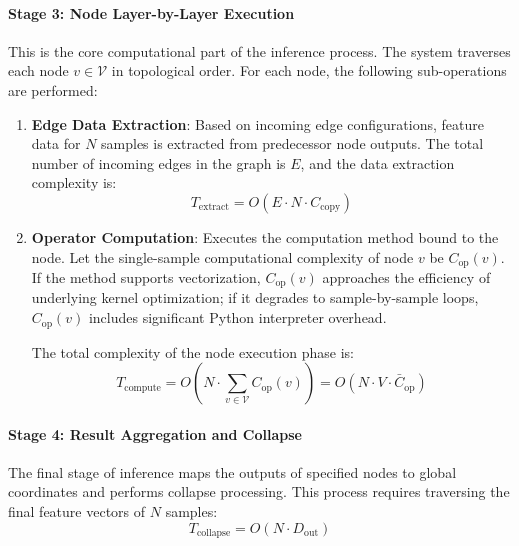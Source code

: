 \paragraph{Stage 3: Node Layer-by-Layer Execution}
This is the core computational part of the inference process. The system traverses each node $v \in \mathcal{V}$ in topological order. For each node, the following sub-operations are performed:

\begin{enumerate}
    \item \textbf{Edge Data Extraction}: Based on incoming edge configurations, feature data for $N$ samples is extracted from predecessor node outputs. The total number of incoming edges in the graph is $E$, and the data extraction complexity is:
    \begin{equation}
        T_{\mathrm{extract}} = O(E \cdot N \cdot C_{\mathrm{copy}})
    \end{equation}
    
    \item \textbf{Operator Computation}: Executes the computation method bound to the node. Let the single-sample computational complexity of node $v$ be $C_{\mathrm{op}}(v)$. If the method supports vectorization, $C_{\mathrm{op}}(v)$ approaches the efficiency of underlying kernel optimization; if it degrades to sample-by-sample loops, $C_{\mathrm{op}}(v)$ includes significant Python interpreter overhead.
    
    The total complexity of the node execution phase is:
    \begin{equation}
        T_{\mathrm{compute}} = O\left(N \cdot \sum_{v \in \mathcal{V}} C_{\mathrm{op}}(v)\right) = O(N \cdot V \cdot \bar{C}_{\mathrm{op}})
    \end{equation}
\end{enumerate}

\paragraph{Stage 4: Result Aggregation and Collapse}
The final stage of inference maps the outputs of specified nodes to global coordinates and performs collapse processing. This process requires traversing the final feature vectors of $N$ samples:
\begin{equation}
    T_{\mathrm{collapse}} = O(N \cdot D_{\mathrm{out}})
\end{equation}

